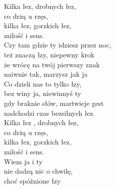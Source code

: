 \begin{text}
    Kilka łez, drobnych łez,\\
    co drżą u rzęs,\\
    kilka łez, gorzkich łez,\\
    miłość i sens.\\
    Czy tam gdzie ty idziesz przez noc,\\
    też znaczą łzy, niepewny krok\\
    że wrócę na twój pierwszy znak\\
    naiwnie tak, marzysz jak ja\\
    Co dzieli nas to tylko łzy,\\
    bez winy ja, niewinnyś ty\\
    gdy braknie słów, martwieje gest\\
    nadchodzi czas bezsilnych łez.\\
    Kilka łez , drobnych łez,\\
    co drżą u rzęs,\\
    kilka łez, gorzkich łez,\\
    miłość i sens.\\
    Wiem ja i ty\\
    nie dadzą nic o chwilę,\\
    choć spóźnione łzy
\end{text}
\begin{chord}

\end{chord}